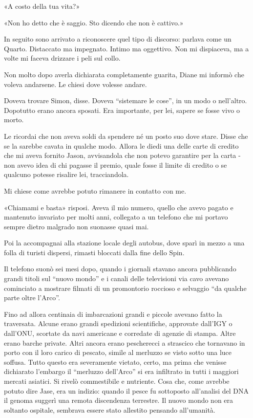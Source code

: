 «A costo della tua vita?»

«Non ho detto che è saggio. Sto dicendo che non è cattivo.»

In seguito sono arrivato a riconoscere quel tipo di discorso: parlava
come un Quarto. Distaccato ma impegnato. Intimo ma oggettivo. Non mi
dispiaceva, ma a volte mi faceva drizzare i peli sul collo.

\separatorefiori

Non molto dopo averla dichiarata completamente guarita, Diane mi informò
che voleva andarsene. Le chiesi dove volesse andare.

Doveva trovare Simon, disse. Doveva ``sistemare le cose'', in un modo o
nell'altro. Dopotutto erano ancora sposati. Era importante, per lei,
sapere se fosse vivo o morto.

Le ricordai che non aveva soldi da spendere né un posto suo dove stare.
Disse che se la sarebbe cavata in qualche modo. Allora le diedi una
delle carte di credito che mi aveva fornito Jason, avvisandola che non
potevo garantire per la carta - non avevo idea di chi pagasse il premio,
quale fosse il limite di credito o se qualcuno potesse risalire lei,
tracciandola.

Mi chiese come avrebbe potuto rimanere in contatto con me.

«Chiamami e basta» risposi. Aveva il mio numero, quello che avevo pagato
e mantenuto invariato per molti anni, collegato a un telefono che mi
portavo sempre dietro malgrado non suonasse quasi mai.

Poi la accompagnai alla stazione locale degli autobus, dove sparì in
mezzo a una folla di turisti dispersi, rimasti bloccati dalla fine dello
Spin.

\separatorefiori

Il telefono suonò sei mesi dopo, quando i giornali stavano ancora
pubblicando grandi titoli sul ``nuovo mondo'' e i canali delle
televisioni via cavo avevano cominciato a mostrare filmati di un
promontorio roccioso e selvaggio ``da qualche parte oltre l'Arco''.

Fino ad allora centinaia di imbarcazioni grandi e piccole avevano fatto
la traversata. Alcune erano grandi spedizioni scientifiche, approvate
dall'IGY o dall'ONU, scortate da navi americane e corredate di agenzie
di stampa. Altre erano barche private. Altri ancora erano pescherecci a
strascico che tornavano in porto con il loro carico di pescato, simile
al merluzzo se visto sotto una luce soffusa. Tutto questo era
severamente vietato, certo, ma prima che venisse dichiarato l'embargo il
``merluzzo dell'Arco'' si era infiltrato in tutti i maggiori mercati
asiatici. Si rivelò commestibile e nutriente. Cosa che, come avrebbe
potuto dire Jase, era un indizio: quando il pesce fu sottoposto
all'analisi del DNA il genoma suggerì una remota discendenza terrestre.
Il nuovo mondo non era soltanto ospitale, sembrava essere stato
allestito pensando all'umanità.

